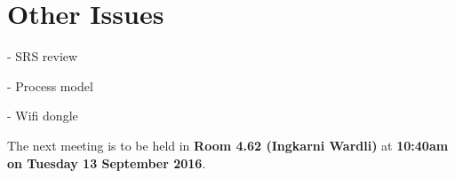 \documentclass[11pt, a4paper]{article}
\begin{document}
\section{Other Issues}

\begin{list}{}
\item {-} SRS review
\item {-} Process model
\item {-} Wifi dongle
\end{list}


\vspace*{10pt}

\noindent The next meeting is to be held in {\bf Room 4.62 (Ingkarni Wardli)} at {\bf 10:40am on Tuesday 13 September 2016}.
\end{document}
